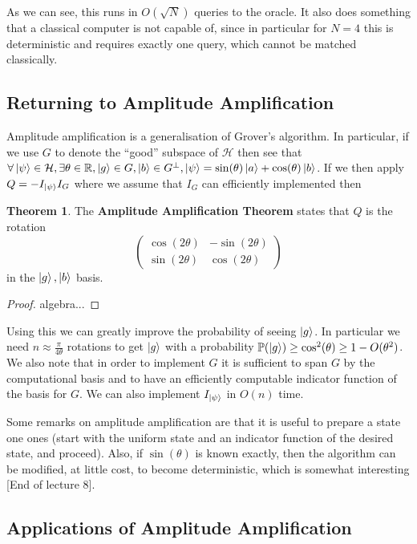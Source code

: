 \documentclass{article}
\theoremstyle{definition}
\newtheorem{theorem}{Theorem}
\begin{document}
As we can see, this runs in $O(\sqrt{N})$ queries to the oracle. It also does
something that a classical computer is not capable of, since in particular for
$N = 4$ this is deterministic and requires exactly one query, which cannot be
matched classically.

\subsection{Returning to Amplitude Amplification}

Amplitude amplification is a generalisation of Grover's algorithm. In
particular, if we use $G$ to denote the ``good'' subspace of $\mathcal{H}$ then
see that $\forall \ket{\psi} \in \mathcal{H}, \exists \theta \in \mathbb{R},
\ket{g} \in G, \ket{b} \in G^\perp, \ket{\psi} = \sin(\theta) \ket{a} +
\cos(\theta) \ket{b}$. If we then apply $Q = -I_{\ket{\psi}} I_G$ where we
assume that $I_G$ can efficiently implemented then

\begin{theorem}
  The \textbf{Amplitude Amplification Theorem} states that $Q$ is the rotation
  $$
  \begin{pmatrix}
    \cos(2\theta) & -\sin(2\theta) \\
    \sin(2\theta) & \cos(2\theta)
  \end{pmatrix}
  $$
  in the $\ket{g}, \ket{b}$ basis.
\end{theorem}

\begin{proof}
  algebra...
\end{proof}

Using this we can greatly improve the probability of seeing $\ket{g}$. In
particular we need $n \approx \frac{\pi}{4 \theta}$ rotations to get $\ket{g}$
with a probability $\mathbb{P}(\ket{g}) \geq \cos^2(\theta) \geq 1 -
O(\theta^2)$. We also note that in order to implement $G$ it is sufficient to
span $G$ by the computational basis and to have an efficiently computable
indicator function of the basis for $G$. We can also implement $I_{\ket{\psi}}$
in $O(n)$ time.

Some remarks on amplitude amplification are that it is useful to prepare a state
one ones (start with the uniform state and an indicator function of the desired
state, and proceed). Also, if $\sin(\theta)$ is known exactly, then the
algorithm can be modified, at little cost, to become deterministic, which is
somewhat interesting [End of lecture 8].

\subsection{Applications of Amplitude Amplification}
\end{document}
